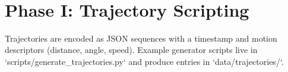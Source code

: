 \
\section{Phase I: Trajectory Scripting}
Trajectories are encoded as JSON sequences with a timestamp and motion descriptors (distance, angle, speed). Example generator scripts live in `scripts/generate_trajectories.py` and produce entries in `data/trajectories/`.
